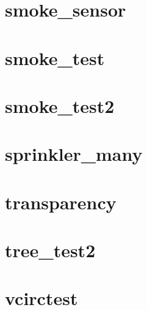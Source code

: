 \documentclass[11pt,twoside]{book}
\begin{document}
\section{smoke\_sensor}
\label{SSFsmokesensor}

\section{smoke\_test}
\label{SSFsmoketest}

\section{smoke\_test2}
\label{SSFsmoketest2}

\section{sprinkler\_many}
\label{SSFspinklermany}

\section{transparency}
\label{SSFtransparency}

\section{tree\_test2}

\section{vcirctest}
\end{document}
